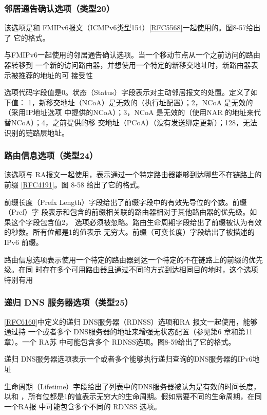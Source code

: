 \subsubsection{邻居通告确认选项（类型20）}
该选项是和
FMIPv6报文（ICMPv6类型154）\href{https://www.rfc-editor.org/rfc/rfc5568}{[RFC5568]}一起使用的。图8-57给出了
它的格式。

与FMIPv6一起使用的邻居通告确认选项。当一个移动节点从一个之前访问的路由器转移到
一个新的访问路由器，并想使用一个特定的新移交地址时，新路由器表示被推荐的地址的可
接受性

选项代码字段值是0。状态（Status）字段表示对主动邻居报文的处置。定义了如下值：
1，新移交地址（NCoA）是无效的（执行址配置）；2，NCoA 是无效的（采用IP地址选项
中提供的NCoA）；3，NCoA 是无效的（使用NAR 的地址来代替NCoA）；4，之前提供的移
交地址（PCoA）（没有发送绑定更新）；128，无法识别的链路层地址。

\subsubsection{路由信息选项（类型24）}
该选项与 RA报文一起使用，表示通过一个特定路由器能够到达哪些不在链路上的前缀
\href{https://www.rfc-editor.org/rfc/rfc4191}{[RFC4191]}。图 8-58 给出了它的格式。

前缀长度（Prefx Length）字段给出了前缀字段中的有效先导位的个数。前缀（Pref）字
段表示和包含的前缀相关联的路由器相对于其他路由器的优先级。如果这个字段包含值2，
选项必须被忽略。路由生命周期字段给出了前缀被认为有效的秒数。所有位都是1的值表示
无穷大。前缀（可变长度）字段给出了被描述的IPv6 前缀。

路由信息选项表示使用一个特定的路由器到达一个特定的不在链路上的前缀的优先级。在同
时存在多个可用路由器且通过不同的方式到达相同目的地时，这个选项特别有用

\subsubsection{递归 DNS 服务器选项（类型25）}

\href{https://www.rfc-editor.org/rfc/rfc6160}{[RFC6160]}中定义的递归
DNS服务器（RDNSS）选项和RA 报文一起使用，能够通过持
一个或者多个 DNS服务器的地址来增强无状态配置（参见第6 章和第11章）。一个 RA苏
中可能包含多个 RDNSS选项。图8-59给出了它的格式。

递归 DNS服务器选项表示一个或者多个能够执行递归查询的DNS服务器的IPv6地址

生命周期（Lifetime）字段给出了列表中的DNS服务器被认为是有效的时间长度，以和
，所有位都是1的值表示无穷大的生命周期。假如需要不同的生命周期，在同一个RA报
中可能包含多个不同的 RDNSS 选项。

